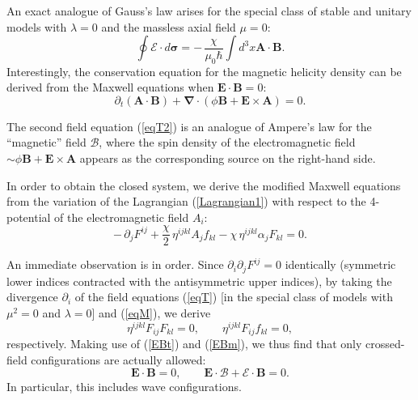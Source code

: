 \documentclass[12pt,prd,showkeys,amsmath,amssymb,nofootinbib]{revtex4-1}
\begin{document}
An exact analogue of Gauss's law arises for the special class of stable and unitary models with $\lambda=0$ and the massless axial field $\mu=0$:
\begin{equation}
\oint \bm{\mathcal E}\cdot d\bm{\sigma} = - \,\frac{\chi}{\mu_0\hbar}\int d^3x \bm{A}\cdot\bm{B}.
\end{equation}
Interestingly, the conservation equation for the magnetic helicity density can be derived from the Maxwell equations when $\bm{E}\cdot\bm{B}=0$:
\begin{equation}
\partial_t(\bm{A}\cdot\bm{B})+\bm{\nabla}\cdot\left(\phi\bm{B}+\bm{E}\times\bm{A}\right) = 0.
\end{equation}

The second field equation (\ref{eqT2}) is an analogue of Ampere's law for the ``magnetic'' field $\bm{\mathcal B}$, where the spin density of the electromagnetic field $\sim \phi\bm{B}+\bm{E}\times\bm{A}$ appears as the corresponding source on the right-hand side.

In order to obtain the closed system, we derive the modified Maxwell equations from the variation of the Lagrangian (\ref{Lagrangian1}) with respect to the 4-potential of the electromagnetic field $A_i$: 
\begin{equation}\label{eqM}
-\,\partial_jF^{ij} + {\frac{\chi}{2}}\,\eta^{ijkl}A_jf_{kl} - \chi\,\eta^{ijkl}\alpha_jF_{kl} = 0.
\end{equation}

An immediate observation is in order. Since $\partial_i\partial_jF^{ij} = 0$ identically (symmetric lower indices contracted with the antisymmetric upper indices), by taking the divergence $\partial_i$ of the field equations (\ref{eqT}) [in the special class of models with $\mu^2 = 0$ and $\lambda = 0$] and (\ref{eqM}), we derive
\begin{equation}\label{FF0}
\eta^{ijkl}F_{ij}F_{kl} = 0,\qquad \eta^{ijkl}F_{ij}f_{kl} = 0,
\end{equation}
respectively. Making use of (\ref{EBt}) and (\ref{EBm}), we thus find that only crossed-field configurations are actually allowed:
\begin{equation}\label{EB0}
\bm{E}\cdot\bm{B} = 0,\qquad \bm{E}\cdot\bm{\mathcal B} + \bm{\mathcal E}\cdot\bm{B} = 0.
\end{equation}
In particular, this includes wave configurations. 
\end{document}
